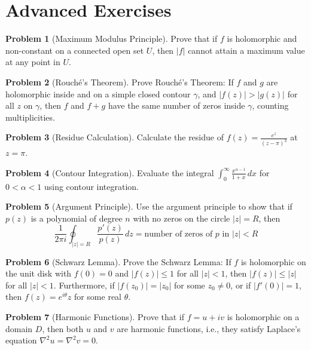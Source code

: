 \documentclass[12pt,a4paper]{article}
\theoremstyle{plain}
\theoremstyle{definition}
\newtheorem{problem}{Problem}[section]
\begin{document}
\section{Advanced Exercises}

\begin{problem}[Maximum Modulus Principle]
Prove that if $f$ is holomorphic and non-constant on a connected open set $U$, then $|f|$ cannot attain a maximum value at any point in $U$.
\end{problem}

\begin{problem}[Rouché's Theorem]
Prove Rouché's Theorem: If $f$ and $g$ are holomorphic inside and on a simple closed contour $\gamma$, and $|f(z)| > |g(z)|$ for all $z$ on $\gamma$, then $f$ and $f+g$ have the same number of zeros inside $\gamma$, counting multiplicities.
\end{problem}

\begin{problem}[Residue Calculation]
Calculate the residue of $f(z) = \frac{e^z}{(z-\pi)^3}$ at $z = \pi$.
\end{problem}

\begin{problem}[Contour Integration]
Evaluate the integral $\int_{0}^{\infty} \frac{x^{\alpha-1}}{1+x} \, dx$ for $0 < \alpha < 1$ using contour integration.
\end{problem}

\begin{problem}[Argument Principle]
Use the argument principle to show that if $p(z)$ is a polynomial of degree $n$ with no zeros on the circle $|z| = R$, then
\[\frac{1}{2\pi i} \oint_{|z|=R} \frac{p'(z)}{p(z)} \, dz = \text{number of zeros of $p$ in $|z| < R$}\]
\end{problem}

\begin{problem}[Schwarz Lemma]
Prove the Schwarz Lemma: If $f$ is holomorphic on the unit disk with $f(0) = 0$ and $|f(z)| \leq 1$ for all $|z| < 1$, then $|f(z)| \leq |z|$ for all $|z| < 1$. Furthermore, if $|f(z_0)| = |z_0|$ for some $z_0 \neq 0$, or if $|f'(0)| = 1$, then $f(z) = e^{i\theta}z$ for some real $\theta$.
\end{problem}

\begin{problem}[Harmonic Functions]
Prove that if $f = u + iv$ is holomorphic on a domain $D$, then both $u$ and $v$ are harmonic functions, i.e., they satisfy Laplace's equation $\nabla^2 u = \nabla^2 v = 0$.
\end{problem}
\end{document}
